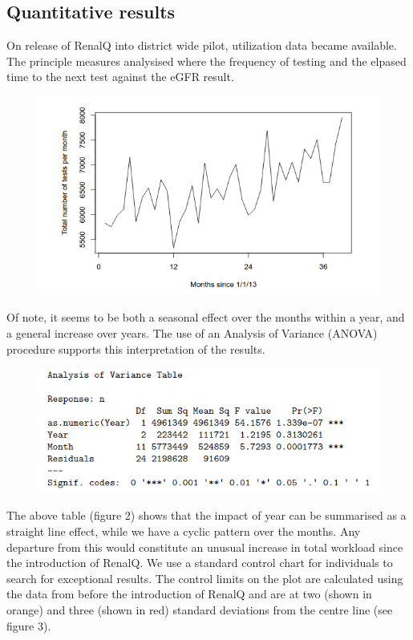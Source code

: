 ﻿\documentclass[11pt]{article}
\begin{document}
\subsection{Quantitative results}
On release of RenalQ into district wide pilot, utilization data became available. The principle measures analysised where the frequency of testing and the elpased time to the next test against the eGFR result.\\

\begin{figure}[htp]
\centering
\includegraphics[scale=0.50]{Fig1.png}
\caption{}
\label{}
\end{figure}

Of note, it seems to be both a seasonal effect over the months within a year, and a general increase over years.  The use of an Analysis of Variance (ANOVA) procedure supports this interpretation of the results.\\

\begin{figure}[htp]
\centering
\includegraphics[scale=0.50]{fig2.png}
\caption{}
\label{}
\end{figure}

The above table (figure 2) shows that the impact of year can be summarised as a straight line effect, while we have a cyclic pattern over the months. Any departure from this would constitute an unusual increase in total workload since the introduction of RenalQ. We use a standard control chart for individuals to search for exceptional results. The control limits on the plot are calculated using the data from before the introduction of RenalQ and are at two (shown in orange) and three (shown in red) standard deviations from the centre line (see figure 3).\\
\end{document}
